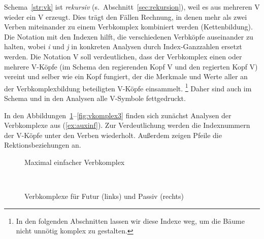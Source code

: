 

Schema~\ref{str:vk} ist \textit{rekursiv} (s.\ Abschnitt~\ref{sec:rekursion}), weil es aus mehreren V wieder ein V erzeugt.
Dies trägt den Fällen Rechnung, in denen mehr als zwei Verben miteinander zu einem Verbkomplex kombiniert werden (Kettenbildung).
Die Notation mit den Indexen hilft, die verschiedenen Verbköpfe auseinander zu halten, wobei \textit{i} und \textit{j} in konkreten Analysen durch Index-Ganzzahlen ersetzt werden.
Die Notation V soll verdeutlichen, dass der Verbkomplex einen oder mehrere V-Köpfe (im Schema den regierenden Kopf V und den regierten Kopf V) vereint und selber wie ein Kopf fungiert, der die Merkmale und Werte aller an der Verbkomplexbildung beteiligten V-Köpfe einsammelt.%
\footnote{In den folgenden Abschnitten lassen wir diese Indexe weg, um die Bäume nicht unnötig komplex zu gestalten.}
Daher sind auch im Schema und in den Analysen alle V-Symbole fettgedruckt.

In den Abbildungen~\ref{fig:vkomplex0}--\ref{fig:vkomplex3} finden sich zunächst Analysen der Verbkomplexe aus (\ref{ex:auxinf}).
Zur Verdeutlichung werden die Indexnummern der V-Köpfe unter den Verben wiederholt.
Außerdem zeigen Pfeile die Rektionsbeziehungen an.

\begin{figure}[!htbp]
  \centering
  \caption{Maximal einfacher Verbkomplex}
  \label{fig:vkomplex0}
\end{figure}

\begin{figure}[!htbp]
  \centering
  ~
  \vspace{0.3cm}
  \caption{Verbkomplexe für Futur (links) und Passiv (rechts)}
  \label{fig:vkomplex2}
\end{figure}

